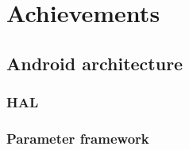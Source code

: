 \chapter{Achievements}

\section{Android architecture}
\subsection{HAL}
\subsection{Parameter framework}

